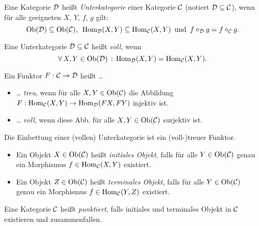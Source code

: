 \documentclass{cheat-sheet}
\begin{document}


\begin{defn}
  Eine Kategorie $\mathcal{D}$ heißt \emph{Unterkategorie} einer Kategorie $\mathcal{C}$ (notiert $\mathcal{D} \subseteq \mathcal{C}$), wenn für alle geeigneten $X$, $Y$, $f$, $g$ gilt:
  \[
    \operatorname{Ob}(\mathcal{D}) \subseteq \operatorname{Ob}(\mathcal{C}), \enspace
    \operatorname{Hom}_{\mathcal{D}}(X, Y) \subseteq \operatorname{Hom}_{\mathcal{C}}(X, Y) \enspace \text{und} \enspace
    f \circ_{\mathcal{D}} g = f \circ_{\mathcal{C}} g.
  \]
\end{defn}

\begin{defn}
  Eine Unterkategorie $\mathcal{D} \subseteq \mathcal{C}$ heißt \emph{voll}, wenn
  \[ \forall \, {X, Y \in \operatorname{Ob}(\mathcal{D})} \,:\, \operatorname{Hom}_{\mathcal{D}}(X, Y) = \operatorname{Hom}_{\mathcal{C}}(X, Y). \]
\end{defn}

\begin{defn}
  Ein Funktor $F : \mathcal{C} \to \mathcal{D}$ heißt \ldots
  \begin{itemize}
    \item \ldots{} \emph{treu}, wenn für alle $X, Y \in \operatorname{Ob}(\mathcal{C})$ die Abbildung
    $F : \operatorname{Hom}_{\mathcal{C}}(X, Y) \to \operatorname{Hom}_{\mathcal{D}}(FX, FY)$
    injektiv ist.
    \item \ldots{} \emph{voll}, wenn diese Abb. für alle $X, Y \in \operatorname{Ob}(\mathcal{C})$ surjektiv ist.
  \end{itemize}
\end{defn}

\begin{bem}
  Die Einbettung einer (vollen) Unterkategorie ist ein (voll-)treuer Funktor.
\end{bem}

\begin{defn}
  \begin{itemize}
    \item Ein Objekt $X \in \operatorname{Ob}(\mathcal{C})$ heißt \emph{initiales Objekt}, falls für alle $Y \in \operatorname{Ob}(\mathcal{C})$ genau ein Morphismus $f \in \operatorname{Hom}_{\mathcal{C}}(X, Y)$ existiert.
    \item Ein Objekt $Z \in \operatorname{Ob}(\mathcal{C})$ heißt \emph{terminales Objekt}, falls für alle $Y \in \operatorname{Ob}(\mathcal{C})$ genau ein Morphismus $f \in \operatorname{Hom}_{\mathcal{C}}(Y, Z)$ existiert.
  \end{itemize}
\end{defn}

\begin{defn}
  Eine Kategorie $\mathcal{C}$ heißt \emph{punktiert}, falls initiales und terminales Objekt in $\mathcal{C}$ existieren und zusammenfallen.
\end{defn}
\end{document}
